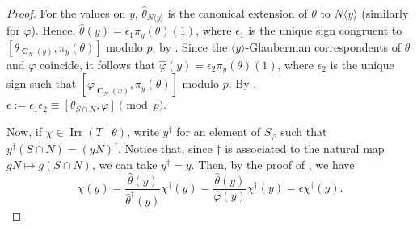 \documentclass[12pt]{amsart}
\DeclareMathOperator{\CB}{\mathbf{C}}
\DeclareMathOperator{\Irr}{Irr}
\theoremstyle{remark}
\theoremstyle{definition}
\theoremstyle{plain}
\theoremstyle{definition}
\numberwithin{equation}{section}
\begin{document}
\begin{proof}
	For the values on $y$, $\widehat{\theta}_{N\langle y \rangle}$ is the canonical extension of $\theta$ to $N \langle y \rangle$ (similarly for $\varphi$). Hence, $\widehat{\theta}(y) = \epsilon_1 \pi_y(\theta)(1)$, where $\epsilon_1$ is the unique sign congruent to $[\theta_{\CB_N(y)}, \pi_y(\theta)]$ modulo $p$, by \cite[Theorem 13.6]{CTFG}. Since the $\langle y \rangle$-Glauberman correspondents of $\theta$ and $\varphi$ coincide, it follows that $\widehat{\varphi}(y) = \epsilon_2 \pi_y(\theta)(1)$, where $\epsilon_2$ is the unique sign such that $[\varphi_{\CB_N(x)}, \pi_y(\theta)]$ modulo $p$. By , $\epsilon := \epsilon_1\epsilon_2 \equiv [\theta_{S \cap N}, \varphi] \pmod{p}$.
	
	Now, if $\chi \in \Irr(T \mid \theta)$, write $y^\dagger$ for an element of $S_\varphi$ such that $y^\dagger (S \cap N) = (yN)^\dagger$. Notice that, since $\dagger$ is associated to the natural map $gN \mapsto g(S \cap N)$, we can take $y^\dagger = y$. Then, by the proof of \cite[Lemma 5.17]{CTMcKC}, we have
	\begin{equation*}
		\chi(y) = \frac{\widehat{\theta}(y)}{\widehat{\theta}^\dagger(y)} \chi^\dagger(y) = \frac{\widehat{\theta}(y)}{\widehat{\varphi}(y)} \chi^\dagger(y) = \epsilon \chi^\dagger(y).
	\end{equation*}
	

\end{proof}
\end{document}
